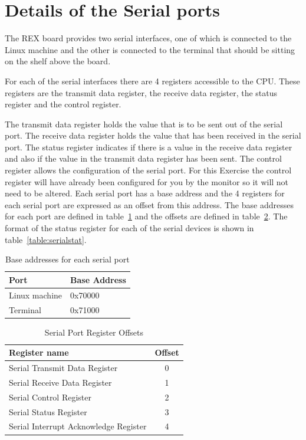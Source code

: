 \documentclass[a4paper,10pt]{article}
\begin{document}
\newpage
\section{Details of the Serial ports}
\label{org_sp_defn}



The REX board provides two serial interfaces, one of which is
connected to the Linux machine and the other is connected to the
terminal that should be sitting on the shelf above the board. 

For each of the serial interfaces there are 4 registers accessible to
the CPU. These registers are the transmit data register, the receive
data register, the status register and the control register.

The transmit data register holds the value that is to be sent out of
the serial port. The receive data register holds the value that has
been received in the serial port. The status register indicates if
there is a value in the receive data register and also if the value in
the transmit data register has been sent. The control register allows
the configuration of the serial port. For this Exercise the control
register will have already been configured for you by the monitor so
it will not need to be altered. Each serial port has a base address
and the 4 registers for each serial port are expressed as an offset
from this address. The base addresses for each port are defined in
table~\ref{table:serialbase} and the offsets are defined in
table~\ref{table:serialoffset}. The format of the status register for
each of the serial devices is shown in table~\ref{table:serialstat}.

\begin{table}[h]
\begin{center}
\begin{tabular}{|l|l|}
\hline
\textbf{Port} & \textbf{Base Address} \\
\hline
Linux machine & 0x70000 \\ 
\hline
Terminal & 0x71000 \\
\hline
\end{tabular}
\end{center}
\caption{Base addresses for each serial port}
\label{table:serialbase}
\end{table}

\begin{table}[h]
\begin{center}
\begin{tabular}{|l|c|}
\hline
\textbf{Register name} & \textbf{Offset} \\
\hline
Serial Transmit Data Register & 0 \\
\hline
Serial Receive Data Register & 1 \\
\hline
Serial Control Register & 2 \\
\hline
Serial Status Register & 3 \\
\hline
Serial Interrupt Acknowledge Register & 4 \\
\hline
\end{tabular}
\caption{Serial Port Register Offsets}
\label{table:serialoffset}
\end{center}
\end{table}
\end{document}
